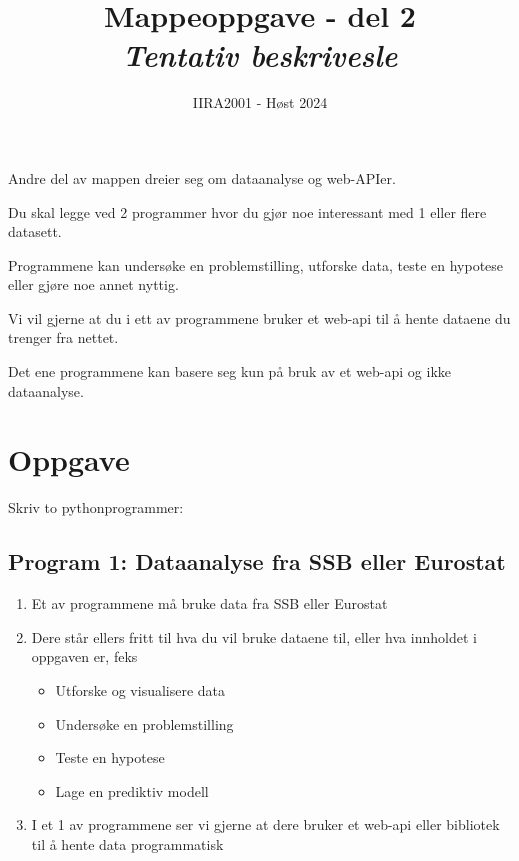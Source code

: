 \documentclass[12pt, titlepage]{article}
\begin{document}
\title{Mappeoppgave - del 2 \\ \textit{Tentativ beskrivesle}}
\author{IIRA2001 - Høst 2024}
\date{}
\maketitle


Andre del av mappen dreier seg om dataanalyse og web-APIer.

Du skal legge ved 2 programmer hvor du gjør noe interessant med 1 eller flere datasett.

Programmene kan undersøke en problemstilling, utforske data, teste en hypotese eller gjøre noe annet nyttig.

Vi vil gjerne at du i ett av programmene bruker et web-api til å hente dataene du trenger fra nettet.

Det ene programmene kan basere seg kun på bruk av et web-api og ikke dataanalyse.

\section*{Oppgave}
Skriv to pythonprogrammer:

\subsection*{Program 1: Dataanalyse fra SSB eller Eurostat}
\begin{enumerate}[$\bullet$]
   \item {Et av programmene må bruke data fra SSB eller Eurostat}
   \item {Dere står ellers fritt til hva du vil bruke dataene til, eller hva innholdet i oppgaven er, feks}
      \begin{itemize}
         \item {Utforske og visualisere data}
         \item {Undersøke en problemstilling}
         \item {Teste en hypotese}
         \item {Lage en prediktiv modell}
      \end{itemize}
   \item {I et 1 av programmene ser vi gjerne at dere bruker et web-api eller bibliotek til å hente data programmatisk}
\end{enumerate}
\end{document}
